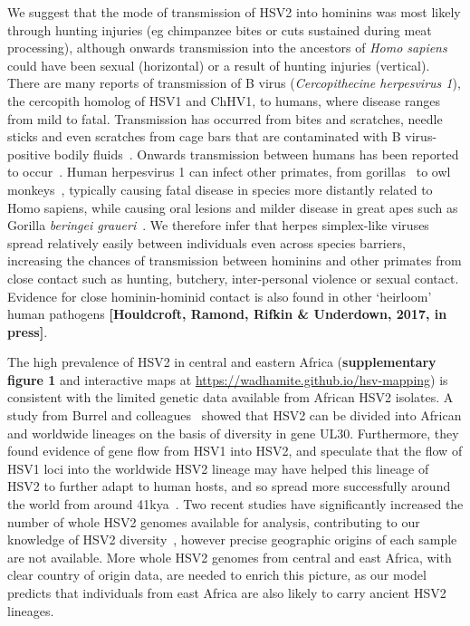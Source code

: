 \documentclass[fleqn,10pt]{wlscirep}
\begin{document}
We suggest that the mode of transmission of HSV2 into hominins was most likely through hunting injuries (eg chimpanzee bites or cuts sustained during meat processing), although onwards transmission into the ancestors of \textit{Homo sapiens} could have been sexual (horizontal) or a result of hunting injuries (vertical). There are many reports of transmission of B virus (\textit{Cercopithecine herpesvirus 1}), the cercopith homolog of HSV1 and ChHV1, to humans, where disease ranges from mild to fatal. Transmission has occurred from bites and scratches, needle sticks and even scratches from cage bars that are contaminated with B virus-positive bodily fluids~\cite{Huff2003}. Onwards transmission between humans has been reported to occur~\cite{CentersforDiseaseControlCDC1987}. Human herpesvirus 1 can infect other primates, from gorillas~\cite{Gilardi2014} to owl monkeys~\cite{Melendez1969}, typically causing fatal disease in species more distantly related to Homo sapiens, while causing oral lesions and milder disease in great apes such as Gorilla \textit{beringei graueri}~\cite{Gilardi2014}. We therefore infer that herpes simplex-like viruses spread relatively easily between individuals even across species barriers, increasing the chances of transmission between hominins and other primates from close contact such as hunting, butchery, inter-personal violence or sexual contact. Evidence for close hominin-hominid contact is also found in other `heirloom' human pathogens \textbf{[Houldcroft, Ramond, Rifkin \& Underdown, 2017, in press]}.

The high prevalence of HSV2 in central and eastern Africa (\textbf{supplementary figure 1 }and interactive maps at \url{https://wadhamite.github.io/hsv-mapping}) is consistent with the limited genetic data available from African HSV2 isolates. A study from Burrel and colleagues~\cite{Burrel2015} showed that HSV2 can be divided into African and worldwide lineages on the basis of diversity in gene UL30. Furthermore, they found evidence of gene flow from HSV1 into HSV2, and speculate that the flow of HSV1 loci into the worldwide HSV2 lineage may have helped this lineage of HSV2 to further adapt to human hosts, and so spread more successfully around the world from around 41kya~\cite{Burrel}. Two recent studies have significantly increased the number of whole HSV2 genomes available for analysis, contributing to our knowledge of HSV2 diversity~\cite{Szpara2014,Kolb2015}, however precise geographic origins of each sample are not available. More whole HSV2 genomes from central and east Africa, with clear country of origin data, are needed to enrich this picture, as our model predicts that individuals from east Africa are also likely to carry ancient HSV2 lineages. 
\end{document}
